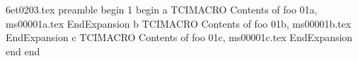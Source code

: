 6et0203.tex preamble
begin
1
begin
a
TCIMACRO
Contents of foo 01a, ms00001a.tex
EndExpansion
b
TCIMACRO
Contents of foo 01b, ms00001b.tex
EndExpansion
c
TCIMACRO
Contents of foo 01c, ms00001c.tex
EndExpansion
end
end
